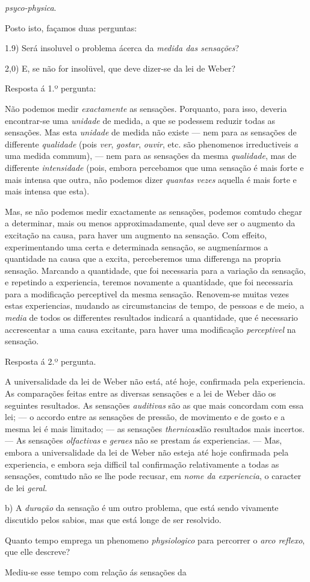 \emph{psyco-physica}.\par Posto isto, façamos duas perguntas:\par 1.9) Será insoluvel o problema ácerca da \emph{medida das sensações}?\par 2,0) E, se não for insolüvel, que deve dizer-se da lei de Weber?\par Resposta á 1.º pergunta:\par Não podemos medir \emph{exactamente} as sensações. Porquanto, para isso, deveria encontrar-se uma \emph{unidade} de medida, a que se podessem reduzir todas as sensações. Mas esta \emph{unidade} de medida não existe --- nem para as sensações de differente \emph{qualidade} (pois \emph{ver}, \emph{gostar}, \emph{ouvir}, etc. são phenomenos irreductiveis \emph{a} uma medida commum), --- nem para as sensações da mesma \emph{qualidade}, mas de differente \emph{intensidade} (pois, embora percebamos que uma sensação é mais forte e mais intensa que outra, não podemos dizer \emph{quantas vezes} aquella é mais forte e mais intensa que esta).\par Mas, se não podemos medir exactamente as sensações, podemos comtudo chegar a determinar, mais ou menos approximadamente, qual deve ser o augmento da excitação na causa, para haver um augmento na sensação. Com effeito, experimentando uma certa e determinada sensação, se augmeníarmos a quantidade na causa que a excita, perceberemos uma differenga na propria sensação. Marcando a quantidade, que foi necessaria para a variação da sensação, e repetindo a experiencia, teremos novamente a quantidade, que foi necessaria para a modificação perceptivel da mesma sensação. Renovem-se muitas vezes estas experiencias, mudando as circumstancias de tempo, de pessoas e de meio, a \emph{media} de todos os differentes resultados indicará a quantidade, que é necessario accrescentar a uma causa excitante, para haver uma modificação \emph{perceptivel} na sensação.\par Resposta á 2.º pergunta.\par A universalidade da lei de Weber não está, até hoje, confirmada pela experiencia. As comparações feitas entre as diversas sensações e a lei de Weber dão os seguintes resultados. As sensações \emph{auditivas} são as que mais concordam com essa lei; --- o accordo entre as sensações de pressão, de movimento e de gosto e a mesma lei é mais limitado; --- as sensações \emph{thernicas}dão resultados mais incertos. --- As sensações \emph{olfactivas} e \emph{geraes} não se prestam ás experiencias. --- Mas, embora a universalidade da lei de Weber não esteja até hoje confirmada pela experiencia, e embora seja difficil tal confirmação relativamente a todas as sensações, comtudo não se lhe pode recusar, em \emph{nome da experiencia}, o caracter de lei \emph{geral}.\par b) A \emph{duração} da sensação é um outro problema, que está sendo vivamente discutido pelos sabios, mas que está longe de ser resolvido.\par Quanto tempo emprega un phenomeno \emph{physiologico} para percorrer o \emph{arco reflexo}, que elle descreve?\par Mediu-se esse tempo com relação ás sensações da 